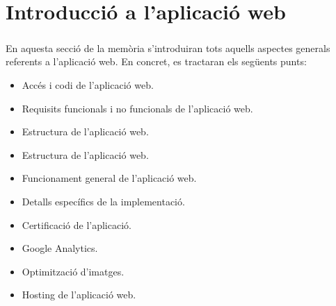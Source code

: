\chapter{Introducció a l'aplicació web}

    \paragraph{}
    En aquesta secció de la memòria s’introduiran tots aquells aspectes generals referents a l’aplicació web. En concret, es tractaran els següents punts:

    \begin{itemize}
        \item Accés i codi de l’aplicació web.
        \item Requisits funcionals i no funcionals de l’aplicació web.
        \item Estructura de l’aplicació web.
        \item Estructura de l’aplicació web.
        \item Funcionament general de l’aplicació web.
        \item Detalls específics de la implementació.
        \item Certificació de l’aplicació.
        \item Google Analytics.
        \item Optimització d’imatges.
        \item Hosting de l’aplicació web.
    \end{itemize}

    
    
    
    
    
    
    
    
    
    
